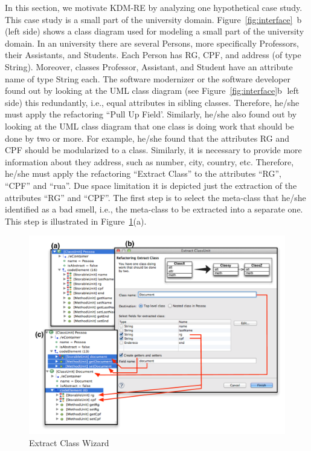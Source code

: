 \documentclass[12pt]{article}
\begin{document}
In this section, we motivate KDM-RE by analyzing  one hypothetical case study. This case study is a small part of the university domain. Figure~\ref{fig:interface}~\textcircled{b} (left side) shows a class diagram used for modeling a small part of the
university domain. In an university there are several Persons, more specifically Professors, their Assistants, and Students. Each Person has RG, CPF, and address (of type String). Moreover, classes Professor, Assistant, and Student have an attribute name of type String each. The software modernizer or the software developer found out by looking at the UML class diagram (see Figure~\ref{fig:interface}\textcircled{b} left side) this redundantly, i.e., equal attributes in sibling classes. Therefore, he/she must apply the refactoring ``Pull Up Field'. Similarly, he/she also found out by looking at the UML class diagram that one class is doing work that should be done by two or more. For example, he/she found that the attributes RG and CPF should be modularized to a class. Similarly, it is necessary to provide more information about they address, such as number, city, country, etc. Therefore, he/she must apply the refactoring ``Extract Class'' to the attributes ``RG'', ``CPF'' and ``rua''. Due space limitation it is depicted just the extraction of the attributes ``RG'' and ``CPF''.  The first step is to select the meta-class that he/she identified as a bad smell, i.e., the meta-class to be extracted into a separate one.  This step is illustrated in Figure~\ref{fig:wizard}(a). 

\begin{figure}[!ht]
\centering
  \includegraphics[scale=0.6]{figure/Wizard2}
\caption{Extract Class Wizard}
\label{fig:wizard}
\end{figure}
\end{document}
